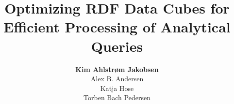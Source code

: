 

\title[Optimizing RDF Data Cubes]{Optimizing RDF Data Cubes for Efficient Processing of Analytical Queries}
\author[Kim Ahlstr\o{}m Jakobsen]{\large \textbf{Kim Ahlstr\o{}m Jakobsen} \\ Alex B. Andersen\\ Katja Hose\\ Torben Bach Pedersen}
\date[]{}



\newcommand{\kimauthor}{\author{Kim Ahlstr\o{}m Jakobsen}}
\begin{frame}
\titlepage
\end{frame}






\newcommand{\intro}{Motivation}

